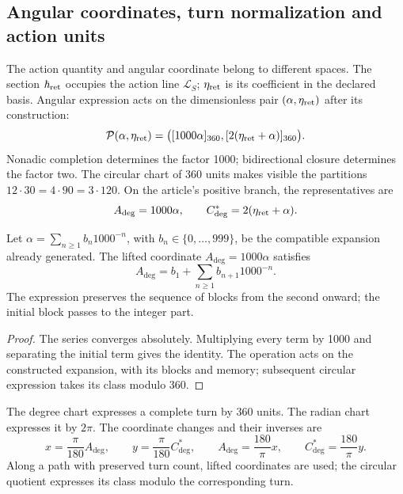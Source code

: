 \subsection{Angular coordinates, turn normalization and action units}
\label{ii:sec:ii-angulos}

The action quantity and angular coordinate belong to different spaces. The section \(\hbar_{\rm ret}\) occupies the action line \(\mathcal L_S\); \(\eta_{\rm ret}\) is its coefficient in the declared basis. Angular expression acts on the dimensionless pair \((\alpha,\eta_{\rm ret})\) after its construction:
\begin{equation}
 \mathcal P(\alpha,\eta_{\rm ret})
 =\bigl([1000\alpha]_{360},[2(\eta_{\rm ret}+\alpha)]_{360}\bigr).
 \label{ii:eq:ii-par-angular}
\end{equation}
Nonadic completion determines the factor 1000; bidirectional closure determines the factor two. The circular chart of 360 units makes visible the partitions \(12\cdot30=4\cdot90=3\cdot120\). On the article's positive branch, the representatives are
\[
 A_{\deg}=1000\alpha,\qquad
 C^*_{\deg}=2(\eta_{\rm ret}+\alpha).
\]

\begin{proposition}
\label{ii:prop:ii-desplazamiento-angular}
Let \(\alpha=\sum_{n\geq1}b_n1000^{-n}\), with
\(b_n\in\{0,\ldots,999\}\), be the compatible expansion already generated.
The lifted coordinate \(A_{\deg}=1000\alpha\) satisfies
\[
 A_{\deg}=b_1+\sum_{n\geq1}b_{n+1}1000^{-n}.
\]
The expression preserves the sequence of blocks from the second onward; the initial block passes to the integer part.
\end{proposition}
\begin{proof}
The series converges absolutely. Multiplying every term by 1000 and separating the initial term gives the identity. The operation acts on the constructed expansion, with its blocks and memory; subsequent circular expression takes its class modulo 360.
\end{proof}

\begin{definition}
The degree chart expresses a complete turn by 360 units. The radian chart expresses it by \(2\pi\). The coordinate changes and their inverses are
\[
 x=\frac{\pi}{180}A_{\deg},\qquad
 y=\frac{\pi}{180}C^*_{\deg},\qquad
 A_{\deg}=\frac{180}{\pi}x,\qquad
 C^*_{\deg}=\frac{180}{\pi}y.
\]
Along a path with preserved turn count, lifted coordinates are used; the circular quotient expresses its class modulo the corresponding turn.
\end{definition}

